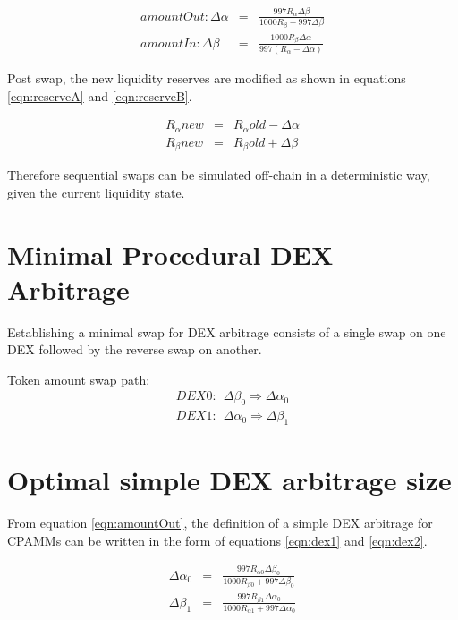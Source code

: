 \documentclass{article}
\begin{document}
\begin{eqnarray}
	amountOut: \Delta\alpha  &=& \frac{997 R_{\alpha} \Delta\beta }{1000 R_{\beta} + 997 \Delta\beta} \label{eqn:amountOut}\\
	amountIn: \Delta\beta  &=& \frac{1000 R_{\beta} \Delta\alpha }{997 (R_{\alpha} - \Delta\alpha)} \label{eqn:amountIn}
\end{eqnarray}

Post swap, the new liquidity reserves are modified as shown in equations \ref{eqn:reserveA} and \ref{eqn:reserveB}.

\begin{eqnarray}
	R_{\alpha}{new}  &=& R_{\alpha}{old} - \Delta\alpha  \label{eqn:reserveA}\\
	R_{\beta}{new}  &=& R_{\beta}{old} + \Delta\beta  \label{eqn:reserveB}
\end{eqnarray}

Therefore sequential swaps can be simulated off-chain in a deterministic way, given the current liquidity state.

\section{Minimal Procedural DEX Arbitrage}
Establishing a minimal swap for DEX arbitrage consists of a single swap on one DEX followed by the reverse swap on another.

Token amount swap path:
\begin{eqnarray}
	DEX0: \: \: \Delta\beta_{0} \Rightarrow \Delta\alpha_{0}\\
	DEX1: \: \: \Delta\alpha_{0} \Rightarrow \Delta\beta_{1}
\end{eqnarray}

\section{Optimal simple DEX arbitrage size}
From equation \ref{eqn:amountOut}, the definition of a simple DEX arbitrage for CPAMMs can be written in the form of equations \ref{eqn:dex1} and \ref{eqn:dex2}.

\begin{eqnarray}
	\Delta\alpha_{0}  &=& \frac{997 R_{\alpha 0} \Delta\beta_{0} }{1000 R_{\beta 0} + 997 \Delta\beta_{0}} \label{eqn:dex1}\\
	\Delta\beta_{1}  &=& \frac{997 R_{\beta 1} \Delta\alpha_{0} }{1000 R_{\alpha 1} + 997 \Delta\alpha_{0}} \label{eqn:dex2}
\end{eqnarray}
\end{document}
